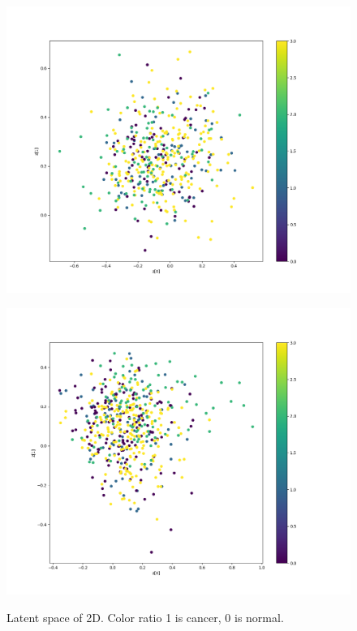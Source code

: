\begin{figure}[H]
\begin{minipage}[b]{0.45\columnwidth}
		\label{fig:}
	\end{minipage}
	\begin{minipage}[b]{0.45\columnwidth}
		\centering
		\includegraphics[clip, width=\linewidth]{fig/variational_auto_encoder/vae_colon_epoch_100_he_mix}
		\label{fig:}
	\end{minipage}
	\begin{minipage}[b]{0.45\columnwidth}
		\centering
		\includegraphics[clip, width=\linewidth]{fig/variational_auto_encoder/vae_colon_epoch_100_rgb_mix}
		\label{fig:}
	\end{minipage}
	
	\caption{Latent space of 2D. Color ratio 1 is cancer, 0 is normal.}
	\label{fig:VAEplot}
	
\end{figure}

